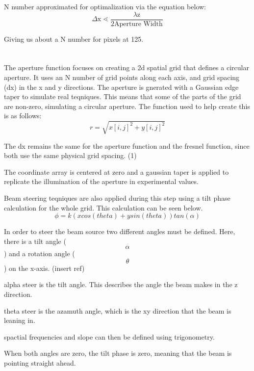 \documentclass[twoside]{article}
\begin{document}
N number approximated for optimalization via the equation below:
\begin{equation}
    \Delta \text{x} \lessdot \frac{\lambda \text{z}}{2 \text{Aperture Width}}
\end{equation}

Giving us about a N number for pixels at 125. 


\section*{}
The aperture function focuses on creating a 2d spatial grid that defines a circular aperture.
 It uses an N number of grid points along each axis, and grid spacing (dx) in the x and y directions.
 The aperture is gnerated with a Gaussian edge taper to simulate real teqniques. This means that some of the parts of the grid
 are non-zero, simulating a circular aperture. The function used to help create this is as follows:
 \begin{equation*}
    r = \sqrt{x[i,j]^2 + y[i,j]^2}
\end{equation*}


The dx remains the same for the aperture function and the fresnel function, since both use the same physical grid spacing. (1)

The coordinate array is centered at zero and a gaussian taper is applied to replicate the illumination of the aperture in experimental values.

Beam steering teqniques are also applied during this step using a tilt phase calculation for the whole grid. This calculation can be seen below.
\begin{equation*}
    \phi = k(xcos(theta) + ysin(theta))tan(\alpha)
\end{equation*}

In order to steer the beam source two different angles must be defined. Here, there is a tilt angle ($$\alpha$$) and a rotation angle ($$\theta$$) on the x-axis. (insert ref)

alpha steer is the tilt angle. This describes the angle the beam makes in the z direction.

theta steer is the azamuth angle, which is the xy direction that the beam is leaning in. 

spactial frequencies and slope can then be defined using trigonometry. 

When both angles are zero, the tilt phase is zero, meaning that the beam is pointing straight ahead. 
\end{document}
